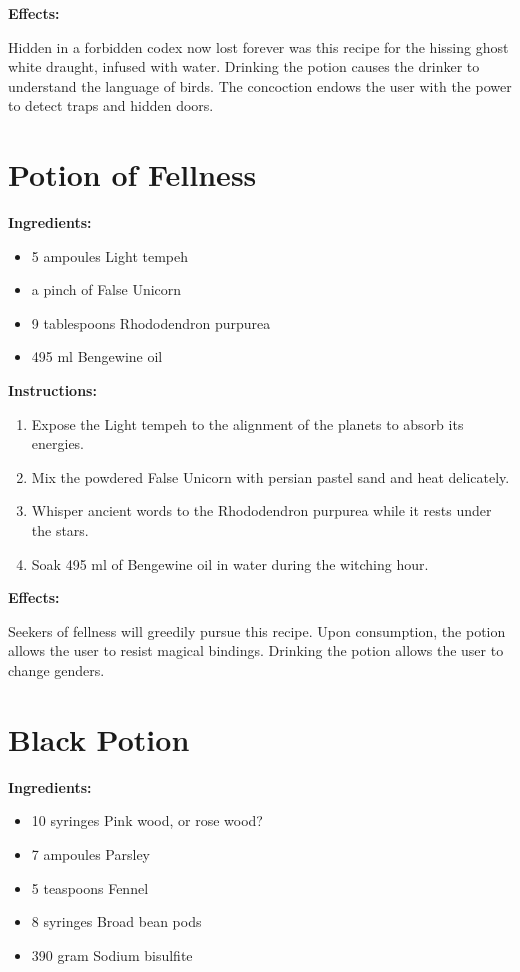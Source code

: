 \documentclass{article}
\begin{document}
\textbf{Effects:}

Hidden in a forbidden codex now lost forever was this recipe for the hissing ghost white draught, infused with water. Drinking the potion causes the drinker to understand the language of birds. The concoction endows the user with the power to detect traps and hidden doors.

\newpage
\section*{Potion of Fellness}

\textbf{Ingredients:}

\begin{itemize}
  \item 5 ampoules Light tempeh
  \item a pinch of False Unicorn
  \item 9 tablespoons Rhododendron purpurea
  \item 495 ml Bengewine oil
\end{itemize}

\textbf{Instructions:}

\begin{enumerate}
  \item Expose the Light tempeh to the alignment of the planets to absorb its energies.
  \item Mix the powdered False Unicorn with persian pastel sand and heat delicately.
  \item Whisper ancient words to the Rhododendron purpurea while it rests under the stars.
  \item Soak 495 ml of Bengewine oil in water during the witching hour.
\end{enumerate}

\textbf{Effects:}

Seekers of fellness will greedily pursue this recipe. Upon consumption, the potion allows the user to resist magical bindings. Drinking the potion allows the user to change genders.

\newpage
\section*{Black Potion}

\textbf{Ingredients:}

\begin{itemize}
  \item 10 syringes Pink wood, or rose wood?
  \item 7 ampoules Parsley
  \item 5 teaspoons Fennel
  \item 8 syringes Broad bean pods
  \item 390 gram Sodium bisulfite
\end{itemize}
\end{document}

